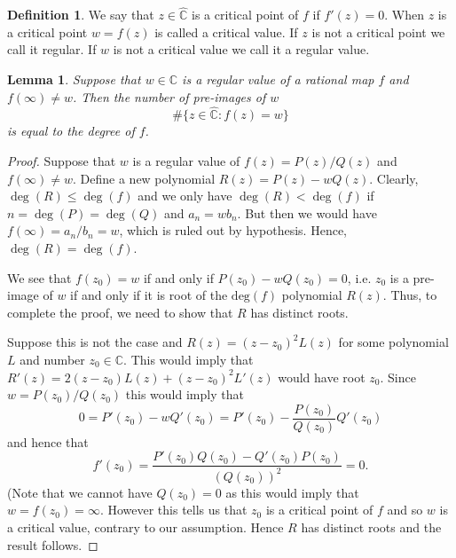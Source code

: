 \documentclass[12pt]{article}
\newtheorem{lemma}[theorem]{Lemma}
\theoremstyle{definition}
\newtheorem{definition}[theorem]{Definition}
\theoremstyle{remark}
\begin{document}
\begin{definition}
We say that $z \in \widehat{\mathbb{C}}$ is a critical point of $f$ if $f'(z) = 0$. When $z$ is a critical point $w= f(z)$ is called a critical value.
If $z$ is not a critical point we call it regular. If $w$ is not a critical value we call it a regular value.
\end{definition}

\begin{lemma}
Suppose that $w \in \mathbb{C}$ is a regular value of a rational map $f$ and $f(\infty) \neq w$. Then the number of pre-images of $w$
\[
\#\{ z \in\widehat{\mathbb{C}} : f(z) =w\}
\]
is equal to the degree of $f$.
\end{lemma}

\begin{proof}
Suppose that $w$ is a regular value of $f(z) = P(z)/Q(z)$ and $f(\infty) \neq w$. 
Define a new polynomial $R(z)=P(z)-wQ(z)$. Clearly, $\deg(R) \le \deg(f)$ and we only have
$\deg(R) < \deg(f)$ if $n = \deg(P) = \deg(Q)$ and $a_n=wb_n$. But then we would have
$f(\infty) =a_n/b_n =w$, which is ruled out by hypothesis. Hence, $\deg(R)=\deg(f)$.

We see that $f(z_0)=w$ 
if and only if $P(z_0) - wQ(z_0) = 0$, i.e. $z_0$ is a pre-image of $w$ if and only if it is root of the $\text{deg}(f)$ polynomial $R(z)$. Thus, to complete the proof, we need to show that $R$ has distinct roots. 

Suppose this is not the case and $R(z) = (z - z_0)^2 L(z)$ for some polynomial $L$ and number $z_0 \in \mathbb{C}$. This would imply that $R'(z) = 2(z-z_0)L(z) + (z-z_0)^2L'(z)$ would have root $z_0$. Since 
$w = P(z_0)/Q(z_0)$ this would imply that
\[
0 = P'(z_0) - w Q'(z_0) = P'(z_0) - \frac{P(z_0)}{Q(z_0)} Q'(z_0)
\]
and hence that
\[
f'(z_0) = \frac{P'(z_0)Q(z_0) - Q'(z_0)P(z_0)}{(Q(z_0))^2} = 0.
\]
(Note that we cannot have $Q(z_0) = 0$ as this would imply that $w = f(z_0) = \infty$. 
However this tells us that $z_0$ is a critical point of $f$ and so $w$ is a critical value, contrary to our assumption. Hence $R$ has distinct roots and the result follows.
\end{proof}
\end{document}
